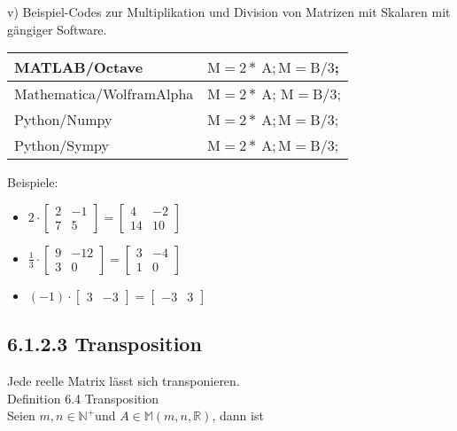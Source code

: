 \documentclass[10pt]{article}
\begin{document}
v) Beispiel-Codes zur Multiplikation und Division von Matrizen mit Skalaren mit gängiger Software.

\begin{center}
\begin{tabular}{|l|l|}
\hline
MATLAB/Octave & $\mathrm{M}=2 * \mathrm{~A} ; \mathrm{M}=\mathrm{B} / 3$; \\
\hline
Mathematica/WolframAlpha & $\mathrm{M}=2 * \mathrm{~A}$; $\mathrm{M}=\mathrm{B} / 3$; \\
\hline
Python/Numpy & $\mathrm{M}=2 * \mathrm{~A} ; \mathrm{M}=\mathrm{B} / 3$; \\
\hline
Python/Sympy & $\mathrm{M}=2 * \mathrm{~A} ; \mathrm{M}=\mathrm{B} / 3$; \\
\hline
\end{tabular}
\end{center}

Beispiele:

\begin{itemize}
  \item $2 \cdot\left[\begin{array}{rr}2 & -1 \\ 7 & 5\end{array}\right]=\left[\begin{array}{rr}4 & -2 \\ 14 & 10\end{array}\right]$
  \item $\frac{1}{3} \cdot\left[\begin{array}{rr}9 & -12 \\ 3 & 0\end{array}\right]=\left[\begin{array}{rr}3 & -4 \\ 1 & 0\end{array}\right]$
  \item $(-1) \cdot\left[\begin{array}{ll}3 & -3\end{array}\right]=\left[\begin{array}{ll}-3 & 3\end{array}\right]$
\end{itemize}

\subsection*{6.1.2.3 Transposition}
Jede reelle Matrix lässt sich transponieren.\\
Definition 6.4 Transposition\\
Seien $m, n \in \mathbb{N}^{+}$und $A \in \mathbb{M}(m, n, \mathbb{R})$, dann ist
\end{document}
